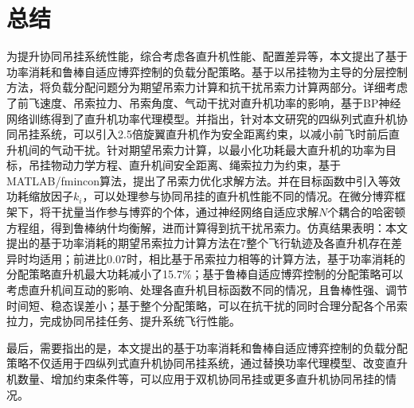\section{总结}
为提升协同吊挂系统性能，综合考虑各直升机性能、配置差异等，本文提出了基于功率消耗和鲁棒自适应博弈控制的负载分配策略。基于以吊挂物为主导的分层控制方法，将负载分配问题分为期望吊索力计算和抗干扰吊索力计算两部分。详细考虑了前飞速度、吊索拉力、吊索角度、气动干扰对直升机功率的影响，基于BP神经网络训练得到了直升机功率代理模型。并指出，针对本文研究的四纵列式直升机协同吊挂系统，可以引入2.5倍旋翼直升机作为安全距离约束，以减小前飞时前后直升机间的气动干扰。针对期望吊索力计算，以最小化功耗最大直升机的功率为目标，吊挂物动力学方程、直升机间安全距离、绳索拉力为约束，基于MATLAB/fmincon算法，提出了吊索力优化求解方法。并在目标函数中引入等效功耗缩放因子$k_i$，可以处理参与协同吊挂的直升机性能不同的情况。在微分博弈框架下，将干扰量当作参与博弈的个体，通过神经网络自适应求解$N$个耦合的哈密顿方程组，得到鲁棒纳什均衡解，进而计算得到抗干扰吊索力。仿真结果表明：本文提出的基于功率消耗的期望吊索拉力计算方法在7整个飞行轨迹及各直升机存在差异时均适用；前进比0.07时，相比基于吊索拉力相等的计算方法，基于功率消耗的分配策略直升机最大功耗减小了15.7\%；基于鲁棒自适应博弈控制的分配策略可以考虑直升机间互动的影响、处理各直升机目标函数不同的情况，且鲁棒性强、调节时间短、稳态误差小；基于整个分配策略，可以在抗干扰的同时合理分配各个吊索拉力，完成协同吊挂任务、提升系统飞行性能。

最后，需要指出的是，本文提出的基于功率消耗和鲁棒自适应博弈控制的负载分配策略不仅适用于四纵列式直升机协同吊挂系统，通过替换功率代理模型、改变直升机数量、增加约束条件等，可以应用于双机协同吊挂或更多直升机协同吊挂的情况。
